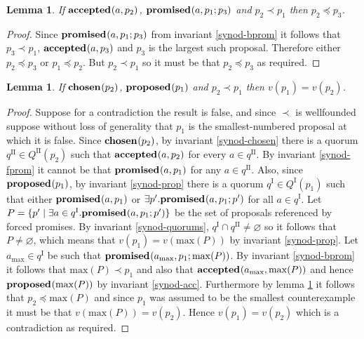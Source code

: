 \documentclass[journal]{IEEEtran}
\newtheorem{lemma}[theorem]{Lemma}
\begin{document}
\begin{lemma}\label{synod-acc-bprom}If $\mathbf{accepted}_{}(a,p_2)$, $\mathbf{promised}_{}(a,p_1;p_3)$
and $p_2 \prec p_1$ then $p_2 \preceq p_3$.\end{lemma}

\begin{proof}Since $\mathbf{promised}_{}(a,p_1;p_3)$ from invariant \ref{synod-bprom} it
follows that $p_3 \prec p_1$, $\mathbf{accepted}_{}(a,p_3)$ and $p_3$ is the largest such
proposal. Therefore either $p_2 \preceq p_3$ or $p_1 \preceq p_2$.  But $p_2
\prec p_1$ so it must be that $p_2 \preceq p_3$ as required.  \end{proof}

\begin{lemma}\label{synod-lemma} If $\mathbf{chosen}_{}(p_2)$, $\mathbf{proposed}_{}(p_1)$ and $p_2
\prec p_1$ then $v(p_1) = v(p_2)$. \end{lemma}

\begin{proof}Suppose for a contradiction the result is false, and since $\prec$
is wellfounded suppose without loss of generality that $p_1$ is the
smallest-numbered proposal at which it is false.  Since $\mathbf{chosen}_{}(p_2)$, by
invariant \ref{synod-chosen} there is a quorum $q^\textrm{II} \in
Q^\textrm{II}(p_2)$ such that $\mathbf{accepted}_{}(a,p_2)$ for every $a \in q^\textrm{II}$.
By invariant \ref{synod-fprom} it cannot be that $\mathbf{promised}_{}(a,p_1)$ for any $a
\in q^\textrm{II}$.  Also, since $\mathbf{proposed}_{}(p_1)$, by invariant \ref{synod-prop}
there is a quorum $q^\textrm{I} \in Q^\textrm{I}(p_1)$ such that either
$\mathbf{promised}_{}(a,p_1)$ or $\exists p'.  \mathbf{promised}_{}(a,p_1;p')$ for all $a \in
q^\textrm{I}$.  Let $P = \{ p' \mid \exists a \in q^\textrm{I}.
\mathbf{promised}_{}(a,p_1;p') \}$ be the set of proposals referenced by forced promises.
By invariant \ref{synod-quorums}, $q^\textrm{I} \cap q^\textrm{II} \ne
\varnothing$ so it follows that $P \ne \varnothing$, which means that $v(p_1) =
v(\mathrm{max}(P))$ by invariant \ref{synod-prop}. Let $a_{\mathrm{max}} \in
q^\textrm{I}$ be such that $\mathbf{promised}_{}(a_{\mathrm{max}},p_1;\mathrm{max}(P))$.
By invariant \ref{synod-bprom} it follows that $\mathrm{max}(P) \prec p_1$ and
also that $\mathbf{accepted}_{}(a_{\mathrm{max}},\mathrm{max}(P))$ and hence
$\mathbf{proposed}_{}(\mathrm{max}(P))$ by invariant \ref{synod-acc}. Furthermore by lemma
\ref{synod-acc-bprom} it follows that $p_2 \preceq \mathrm{max}(P)$ and since
$p_1$ was assumed to be the smallest counterexample it must be that
$v(\mathrm{max}(P)) = v(p_2)$.  Hence $v(p_1) = v(p_2)$ which is a
contradiction as required.  \end{proof}
\end{document}
